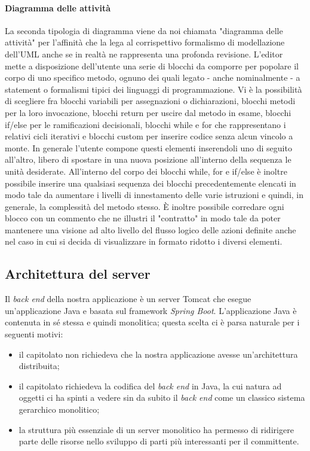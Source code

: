	\paragraph{Diagramma delle attività}
La seconda tipologia di diagramma viene da noi chiamata "diagramma delle attività" per l'affinità che la lega al corrispettivo formalismo di modellazione dell'UML anche se in realtà ne rappresenta una profonda revisione. L'editor mette a disposizione dell'utente una serie di blocchi da comporre per popolare il corpo di uno specifico metodo, ognuno dei quali legato - anche nominalmente - a statement o formalismi tipici dei linguaggi di programmazione. Vi è la possibilità di scegliere fra blocchi variabili per assegnazioni o dichiarazioni, blocchi metodi per la loro invocazione, blocchi return per uscire dal metodo in esame, blocchi if/else per le ramificazioni decisionali, blocchi while e for che rappresentano i relativi cicli iterativi e blocchi custom per inserire codice senza alcun vincolo a monte.
In generale l'utente compone questi elementi inserendoli uno di seguito all'altro, libero di spostare in una nuova posizione all'interno della sequenza le unità desiderate.
All'interno del corpo dei blocchi while, for e if/else è inoltre possibile inserire una qualsiasi sequenza dei blocchi precedentemente elencati in modo tale da aumentare i livelli di innestamento delle varie istruzioni e quindi, in generale, la complessità del metodo stesso.
È inoltre possibile corredare ogni blocco con un commento che ne illustri il "contratto" in modo tale da poter mantenere una visione ad alto livello del flusso logico delle azioni definite anche nel caso in cui si decida di visualizzare in formato ridotto i diversi elementi.




\subsection{Architettura del server} \label{sec:arch_server}

Il \emph{back end} della nostra applicazione \`e un server Tomcat che esegue un'applicazione Java e basata sul framework \emph{Spring Boot}. L'applicazione Java \`e contenuta in sé stessa e quindi monolitica; questa scelta ci \`e parsa naturale per i seguenti motivi:
\begin{itemize}
	\item il capitolato non richiedeva che la nostra applicazione avesse un'architettura distribuita;
	\item il capitolato richiedeva la codifica del \emph{back end} in Java, la cui natura ad oggetti ci ha spinti a vedere sin da subito il \emph{back end} come un classico sistema gerarchico monolitico;
	\item la struttura più essenziale di un server monolitico ha permesso di ridirigere parte delle risorse nello sviluppo di parti più interessanti per il committente.
\end{itemize}


